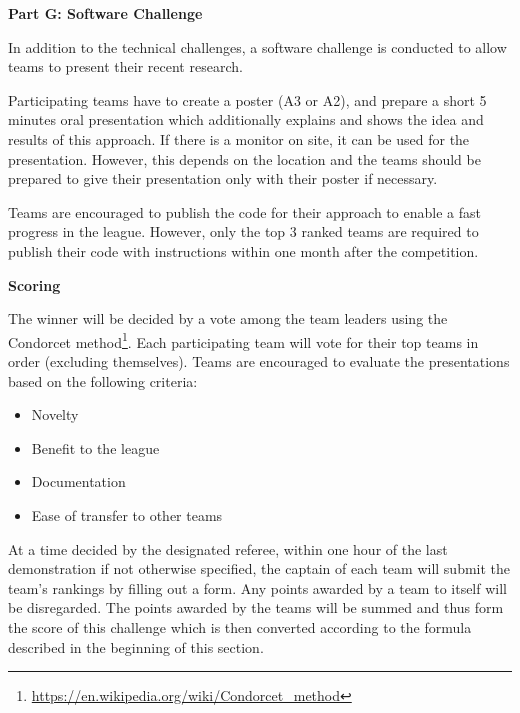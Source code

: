 \clearpage
\sffamily
{\bfseries\color[rgb]{0.4,0.4,0.4} Part G: Software Challenge}
{}

\bigskip
In addition to the technical challenges, a software challenge is conducted to allow teams to present their recent research.

\smallskip

Participating teams have to create a poster (A3 or A2), and prepare a short 5 minutes oral presentation which additionally explains and shows the idea and results of this approach.
If there is a monitor on site, it can be used for the presentation. 
However, this depends on the location and the teams should be prepared to give their presentation only with their poster if necessary.

\smallskip

Teams are encouraged to publish the code for their approach to enable a fast progress in the league. 
However, only the top 3 ranked teams are required to publish their code
with instructions within one month after the competition.
\bigskip

{\bfseries Scoring}
\smallskip

The winner will be decided by a vote among the team leaders using the Condorcet method\footnote{\url{https://en.wikipedia.org/wiki/Condorcet_method}}. 
Each participating team will vote for their top teams in order (excluding themselves). 
Teams are encouraged to evaluate the presentations based on the following criteria:

\begin{itemize}
	\item Novelty
	\item Benefit to the league
	\item Documentation
	\item Ease of transfer to other teams
\end{itemize}

At a time decided by the designated referee, within one hour of the last demonstration if not otherwise specified, the captain of each team will submit the team's rankings by filling out a form. 
Any points awarded by a team to itself will be disregarded.
The points awarded by the teams will be summed and thus form the score of this challenge which is then converted according to the formula described in the beginning of this section.

\smallskip
